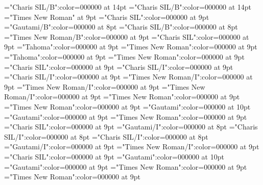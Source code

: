 \documentclass[gps1,twoside]{article}
\begin{document}
\font{}="Charis SIL/B":color=000000 at 14pt
\font{}="Charis SIL/B":color=000000 at 14pt
\font{}="Times New Roman" at 9pt
\font\entryletDatadicBody="Charis SIL":color=000000 at 9pt
\font\headwordggoTeluINentryletDatadicBody="Gautami/B":color=000000 at 8pt
\font\headwordafterentryletDatadicBody="Charis SIL/B":color=000000 at 8pt
\font\spanenheadwordggoTeluINentryletDatadicBody="Times New Roman/B":color=000000 at 9pt
\font\spanentryletDatadicBody="Charis SIL":color=000000 at 9pt
\font\pronunciationggofonipaxemicspanentryletDatadicBody="Tahoma":color=000000 at 9pt
\font\spanenpronunciationggofonipaxemicspanentryletDatadicBody="Times New Roman":color=000000 at 9pt
\font\spanggofonipaxemicpronunciationggofonipaxemicspanentryletDatadicBody="Tahoma":color=000000 at 9pt
\font\spanenspanentryletDatadicBody="Times New Roman":color=000000 at 9pt
\font\sensespanentryletDatadicBody="Charis SIL":color=000000 at 9pt
\font\grammaticalinfosensespanentryletDatadicBody="Charis SIL/I":color=000000 at 9pt
\font\grammaticalinfoaftersensespanentryletDatadicBody="Charis SIL/I":color=000000 at 9pt
\font\partofspeechengrammaticalinfosensespanentryletDatadicBody="Times New Roman/I":color=000000 at 9pt
\font\spanenpartofspeechengrammaticalinfosensespanentryletDatadicBody="Times New Roman/I":color=000000 at 9pt
\font\spanengrammaticalinfosensespanentryletDatadicBody="Times New Roman/I":color=000000 at 9pt
\font{}="Times New Roman":color=000000 at 9pt
\font\spanendefinitionensensespanentryletDatadicBody="Times New Roman":color=000000 at 9pt
\font\LexSensepublishStemGlossPubLdtesensespanentryletDatadicBody="Gautami":color=000000 at 10pt
\font\spanteLexSensepublishStemGlossPubLdtesensespanentryletDatadicBody="Gautami":color=000000 at 9pt
\font\spanenLexSensepublishStemGlossPubLdtesensespanentryletDatadicBody="Times New Roman":color=000000 at 9pt
\font\spansensespanentryletDatadicBody="Charis SIL":color=000000 at 9pt
\font\exampleggoTeluINspansensespanentryletDatadicBody="Gautami/I":color=000000 at 8pt
\font\examplebeforespansensespanentryletDatadicBody="Charis SIL/I":color=000000 at 8pt
\font\exampleafterspansensespanentryletDatadicBody="Charis SIL/I":color=000000 at 8pt
\font\spanggoTeluINexampleggoTeluINspansensespanentryletDatadicBody="Gautami/I":color=000000 at 9pt
\font\spanenexampleggoTeluINspansensespanentryletDatadicBody="Times New Roman/I":color=000000 at 9pt
\font\spanspansensespanentryletDatadicBody="Charis SIL":color=000000 at 9pt
\font\translationLdtespanspansensespanentryletDatadicBody="Gautami":color=000000 at 10pt
\font\spantetranslationLdtespanspansensespanentryletDatadicBody="Gautami":color=000000 at 9pt
\font\spanentranslationLdtespanspansensespanentryletDatadicBody="Times New Roman":color=000000 at 9pt
\font\spanenspansensespanentryletDatadicBody="Times New Roman":color=000000 at 9pt
\end{document}
